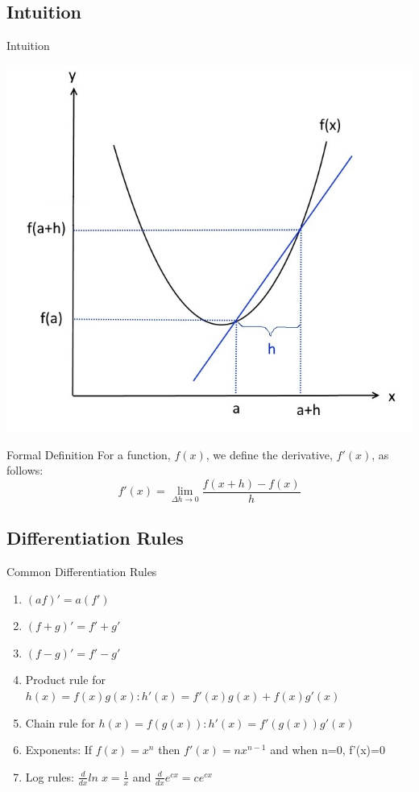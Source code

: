 \documentclass[]{beamer}
\begin{document}
    \subsection{Intuition}

    \begin{frame}{Intuition}
        \begin{center} 
            \includegraphics[scale=0.4]{img/calculus_diffquotient.jpg}
        \end{center}
    \end{frame}

    \begin{frame}{Formal Definition}
        For a function, $f(x)$, we define the derivative, $f'(x)$, as follows:
        $$f'(x) = \lim_{\Delta h\rightarrow 0}\frac{f(x+h)-f(x)}{h}$$
    \end{frame}

\subsection{Differentiation Rules}
    \begin{frame}{Common Differentiation Rules}
        \begin{enumerate}
            \item<2-> $(af)'=a(f')$
            \item<3-> $(f+g)'=f'+ g'$
            \item<4-> $(f-g)'=f'- g'$
            \item<5-> Product rule for $h(x)=f(x)g(x):  h'(x)=f'(x)g(x) + f(x)g'(x)$
            \item<6-> Chain rule for $h(x)=f(g(x)): h'(x)=f'(g(x))g'(x)$
            \item<7-> Exponents: If $f(x)=x^n$ then $f'(x)=nx^{n-1}$ and when n=0, f'(x)=0
            \item<8-> Log rules: $\frac{d}{dx} ln\;x = \frac{1}{x}$ and $\frac{d}{dx}e^{cx}=ce^{cx}$
        \end{enumerate}
    \end{frame}
\end{document}
